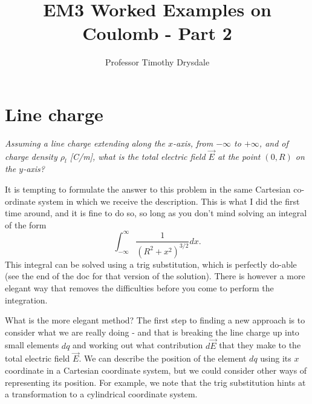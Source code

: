 \documentclass{tufte-handout}
\title{EM3 Worked Examples on Coulomb - Part 2}
\author{Professor Timothy Drysdale}
\begin{document}
\maketitle

\section{Line charge}

\emph{Assuming a line charge extending along the $x$-axis, from $-\infty$ to $+\infty$, and of charge density $\rho_l$ [C/m], what is the total electric field $\vec{E}$ at the point  $(0,R)$ on the $y$-axis?}
\vspace{0.5cm}
\begin{marginfigure}

\end{marginfigure}

It is tempting to formulate the answer to this problem in the same Cartesian co-ordinate system in which we receive the description. This is what I did the first time around, and it is fine to do so, so long as you don't mind solving an integral of the form
\begin{equation}
\int_{-\infty}^{\infty}\frac{1}{(R^2 + x^2)^{3/2}}dx.
\end{equation}
This integral can be solved using a trig substitution, which is perfectly do-able (see the end of the doc for that version of the solution). There is however a more elegant way that removes the difficulties before you come to perform the integration.


What is the more elegant method? The first step to finding a new approach is to consider what we are really doing - and that is breaking the line charge up into small elements $dq$ and working out what contribution $d\vec{E}$ that they make to the total electric field $\vec{E}$. We can describe the position of the element $dq$ using its $x$ coordinate in a Cartesian coordinate system, but we could consider other ways of representing its position. For example, we note that the trig substitution hints at a transformation to a cylindrical coordinate system. 
\begin{marginfigure}

\end{marginfigure}
\end{document}
